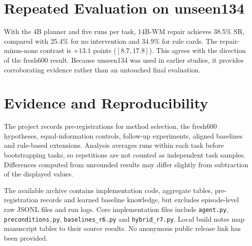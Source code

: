 \section{Repeated Evaluation on unseen134}
With the 4B planner and five runs per task, 14B-WM repair achieves 38.5\% SR, compared with 25.4\% for no intervention and 34.9\% for rule cards. The repair-minus-none contrast is $+13.1$ points ($[8.7,17.8]$). This agrees with the direction of the fresh600 result. Because unseen134 was used in earlier studies, it provides corroborating evidence rather than an untouched final evaluation.

\section{Evidence and Reproducibility}
The project records pre-registrations for method selection, the fresh600 hypotheses, equal-information controls, follow-up experiments, aligned baselines and rule-based extensions. Analysis averages runs within each task before bootstrapping tasks, so repetitions are not counted as independent task samples. Differences computed from unrounded results may differ slightly from subtraction of the displayed values.

The available archive contains implementation code, aggregate tables, pre-registration records and learned baseline knowledge, but excludes episode-level raw JSONL files and run logs. Core implementation files include \texttt{agent.py}, \texttt{preconditions.py}, \texttt{baselines\_r6.py} and \texttt{hybrid\_r7.py}. Local build notes map manuscript tables to their source results. No anonymous public release link has been provided.
